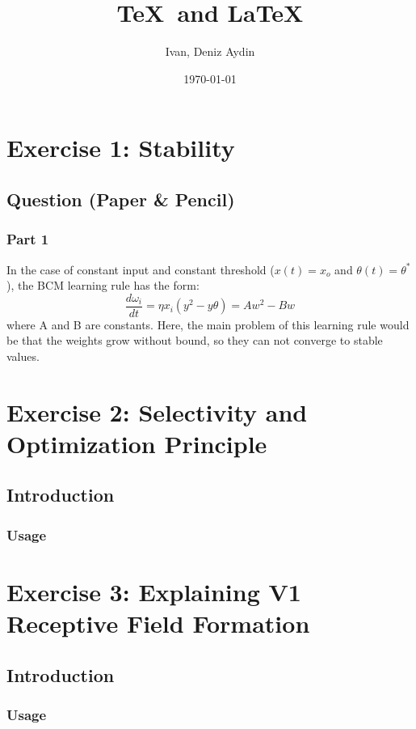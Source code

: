 \documentclass[]{report}   %
\begin{document}
\title{\TeX\ and \LaTeX}   %
\author{Ivan, Deniz Aydin}         %
\date{\today}    %
\maketitle


\chapter{Exercise 1: Stability}             %
\section{Question (Paper \& Pencil)}     %
\subsection{Part 1}       %
In the case of constant input and constant threshold ($x(t)=x_o$ and $\theta(t) = \theta^*$), the BCM learning rule has the form: 
\begin{equation}
\frac{d\omega_i}{dt} = \eta x_i(y^2-y\theta)= Aw^2-Bw
\end{equation}
where A and B are constants. Here, the main problem of this learning rule would be that the weights grow without bound, so they can not converge to stable values.  

\chapter{Exercise 2: Selectivity and Optimization Principle}           %
\section{Introduction}     %
\subsection{Usage}         %

\chapter{Exercise 3: Explaining V1 Receptive Field Formation}           %
\section{Introduction}     %
\subsection{Usage}         %

\begin{thebibliography}{9}
\end{thebibliography}
\end{document}
